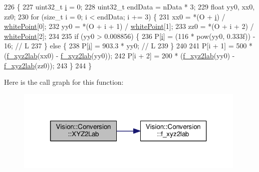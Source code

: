 \begin{DoxyCode}
226                                                       \{
227   uint32\_t \hyperlink{_comparision_pictures_2_createtest_image_8m_a6f6ccfcf58b31cb6412107d9d5281426}{i} = 0;
228   uint32\_t endData = nData * 3;
229   \textcolor{keywordtype}{float} yy0, xx0, zz0;
230   \textcolor{keywordflow}{for} (\textcolor{keywordtype}{size\_t} i = 0; i < endData; i += 3) \{
231     xx0 = *(O + \hyperlink{_comparision_pictures_2_createtest_image_8m_a6f6ccfcf58b31cb6412107d9d5281426}{i}) / \hyperlink{class_vision_1_1_conversion_adbaed406827f7ffb583d003815a9f3f8}{whitePoint}[0];
232     yy0 = *(O + i + 1) / \hyperlink{class_vision_1_1_conversion_adbaed406827f7ffb583d003815a9f3f8}{whitePoint}[1];
233     zz0 = *(O + i + 2) / \hyperlink{class_vision_1_1_conversion_adbaed406827f7ffb583d003815a9f3f8}{whitePoint}[2];
234 
235     \textcolor{keywordflow}{if} (yy0 > 0.008856) \{
236       P[\hyperlink{_comparision_pictures_2_createtest_image_8m_a6f6ccfcf58b31cb6412107d9d5281426}{i}] = (116 * pow(yy0, 0.333f)) - 16; \textcolor{comment}{// L}
237     \} \textcolor{keywordflow}{else} \{
238       P[\hyperlink{_comparision_pictures_2_createtest_image_8m_a6f6ccfcf58b31cb6412107d9d5281426}{i}] = 903.3 * yy0; \textcolor{comment}{// L}
239     \}
240 
241     P[i + 1] = 500 * (\hyperlink{class_vision_1_1_conversion_aea73f90915cd0459dcaf70fb3e109a82}{f\_xyz2lab}(xx0) - \hyperlink{class_vision_1_1_conversion_aea73f90915cd0459dcaf70fb3e109a82}{f\_xyz2lab}(yy0));
242     P[i + 2] = 200 * (\hyperlink{class_vision_1_1_conversion_aea73f90915cd0459dcaf70fb3e109a82}{f\_xyz2lab}(yy0) - \hyperlink{class_vision_1_1_conversion_aea73f90915cd0459dcaf70fb3e109a82}{f\_xyz2lab}(zz0));
243   \}
244 \}
\end{DoxyCode}


Here is the call graph for this function\+:\nopagebreak
\begin{figure}[H]
\begin{center}
\leavevmode
\includegraphics[width=314pt]{class_vision_1_1_conversion_a9ecc41c4226eafc55d0ee0cc550e593b_cgraph}
\end{center}
\end{figure}




